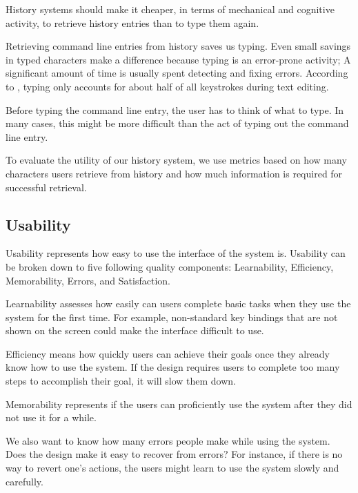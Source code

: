 History systems should make it cheaper, in terms of mechanical and cognitive activity, to retrieve history entries than to type them again.\cite{greenberg1993computer}

Retrieving command line entries from history saves us typing. Even small savings in typed characters make a difference because typing is an error-prone activity; A significant amount of time is usually spent detecting and fixing errors. According to \cite{whiteside1982people}, typing only accounts for about half of all keystrokes during text editing. 

Before typing the command line entry, the user has to think of what to type. In many cases, this might be more difficult than the act of typing out the command line entry. 


To evaluate the utility of our history system, we use metrics based on how many characters users retrieve from history and how much information is required for successful retrieval.

\subsection{Usability}

Usability represents how easy to use the interface of the system is. Usability can be broken down to five following quality components: Learnability, Efficiency, Memorability, Errors, and Satisfaction.\cite{nielsen2012usability}


Learnability assesses how easily can users complete basic tasks when they use the system for the first time. For example, non-standard key bindings that are not shown on the screen could make the interface difficult to use.

Efficiency means how quickly users can achieve their goals once they already know how to use the system. If the design requires users to complete too many steps to accomplish their goal, it will slow them down. 

Memorability represents if the users can proficiently use the system after they did not use it for a while. 

We also want to know how many errors people make while using the system. Does the design make it easy to recover from errors? For instance, if there is no way to revert one's actions, the users might learn to use the system slowly and carefully. 

